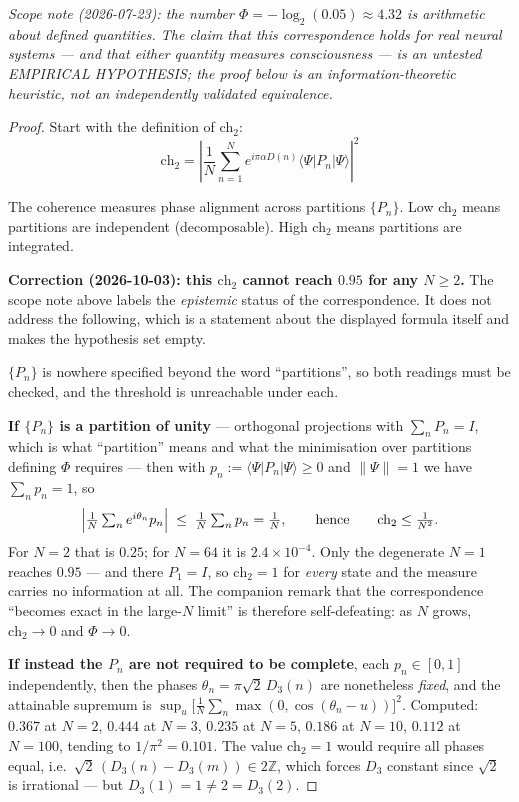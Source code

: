 \noindent\emph{Scope note (2026-07-23): the number $\Phi = -\log_2(0.05) \approx 4.32$ is arithmetic about defined quantities. The claim that this correspondence holds for real neural systems --- and that either quantity measures consciousness --- is an untested EMPIRICAL HYPOTHESIS; the proof below is an information-theoretic heuristic, not an independently validated equivalence.}

\begin{proof}
Start with the definition of ch$_2$:
\begin{equation}
\text{ch}_2 = \left|\frac{1}{N} \sum_{n=1}^{N} e^{i\pi\alpha D(n)} \langle \Psi | P_n | \Psi \rangle\right|^2
\end{equation}

The coherence measures phase alignment across partitions $\{P_n\}$. Low ch$_2$ means partitions are independent (decomposable). High ch$_2$ means partitions are integrated.

\medskip
\noindent\textbf{Correction (2026-10-03): this $\text{ch}_2$ cannot reach $0.95$
for any $N \geq 2$.}
The scope note above labels the \emph{epistemic} status of the correspondence.
It does not address the following, which is a statement about the displayed
formula itself and makes the hypothesis set empty.

$\{P_n\}$ is nowhere specified beyond the word ``partitions'', so both readings
must be checked, and the threshold is unreachable under each.

\textbf{If $\{P_n\}$ is a partition of unity} --- orthogonal projections with
$\sum_n P_n = I$, which is what ``partition'' means and what the minimisation
over partitions defining $\Phi$ requires --- then with
$p_n := \langle\Psi|P_n|\Psi\rangle \geq 0$ and $\|\Psi\| = 1$ we have
$\sum_n p_n = 1$, so
\[
\Bigl|\tfrac1N\textstyle\sum_n e^{i\theta_n}p_n\Bigr| \;\leq\; \tfrac1N\sum_n p_n = \tfrac1N,
\qquad\text{hence}\qquad \text{ch}_2 \leq \tfrac1{N^2}.
\]
For $N = 2$ that is $0.25$; for $N = 64$ it is $2.4\times10^{-4}$. Only the
degenerate $N = 1$ reaches $0.95$ --- and there $P_1 = I$, so $\text{ch}_2 = 1$
for \emph{every} state and the measure carries no information at all. The
companion remark that the correspondence ``becomes exact in the large-$N$ limit''
is therefore self-defeating: as $N$ grows, $\text{ch}_2 \to 0$ and $\Phi \to 0$.

\textbf{If instead the $P_n$ are not required to be complete}, each
$p_n \in [0,1]$ independently, then the phases
$\theta_n = \pi\sqrt2\,D_3(n)$ are nonetheless \emph{fixed}, and the attainable
supremum is $\sup_u\bigl[\tfrac1N\sum_n\max(0,\cos(\theta_n-u))\bigr]^2$.
Computed: $0.367$ at $N=2$, $0.444$ at $N=3$, $0.235$ at $N=5$, $0.186$ at
$N=10$, $0.112$ at $N=100$, tending to $1/\pi^2 = 0.101$. The value
$\text{ch}_2 = 1$ would require all phases equal, i.e.\
$\sqrt2\,(D_3(n)-D_3(m)) \in 2\mathbb{Z}$, which forces $D_3$ constant since
$\sqrt2$ is irrational --- but $D_3(1) = 1 \neq 2 = D_3(2)$.


\end{proof}
